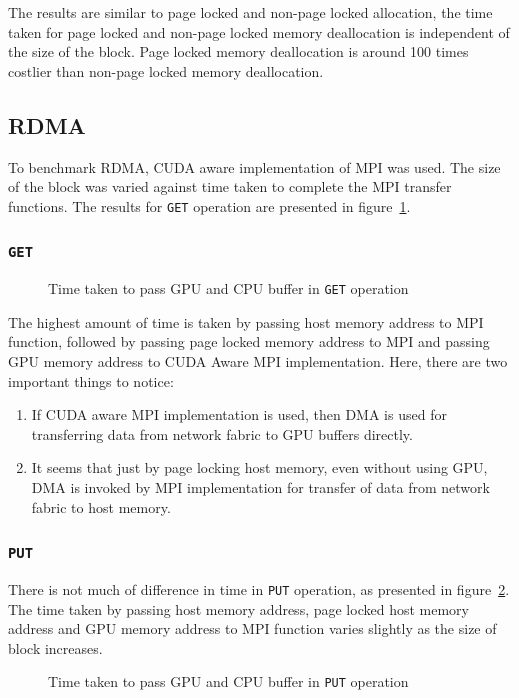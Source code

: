 The results are similar to page locked and non-page locked allocation, the time
taken for page locked and non-page locked memory deallocation is independent of
the size of the block. Page locked memory deallocation is around 100 times costlier
than non-page locked memory deallocation.

\subsection{RDMA}
To benchmark RDMA, CUDA aware implementation of MPI was used. The size of the block
was varied against time taken to complete the MPI transfer functions. The results
for \texttt{GET} operation are presented in figure~\ref{fig:mempin_rdma_get}.

\subsubsection{\texttt{GET}}
\begin{figure}[h]
  
  \caption{Time taken to pass GPU and CPU buffer in \texttt{GET} operation}
  \label{fig:mempin_rdma_get}
\end{figure}


The highest amount of time is taken by passing host memory address to MPI function,
followed by passing page locked memory address to MPI and passing GPU memory
address to CUDA Aware MPI implementation. Here, there are two important things to
notice:
\begin{enumerate}
\item If CUDA aware MPI implementation is used, then DMA is used for transferring
  data from network fabric to GPU buffers directly.
\item It seems that just by page locking host memory, even without using GPU, DMA
  is invoked by MPI implementation for transfer of data from network fabric to
  host memory.
\end{enumerate}

\subsubsection{\texttt{PUT}}
There is not much of difference in time in \texttt{PUT} operation, as presented
in figure~\ref{fig:mempin_rdma_put}. The time taken by passing host memory address,
page locked host memory address and GPU memory address to MPI function varies slightly
as the size of block increases.

\begin{figure}[h]
  
  \caption{Time taken to pass GPU and CPU buffer in \texttt{PUT} operation}
  \label{fig:mempin_rdma_put}
\end{figure}

